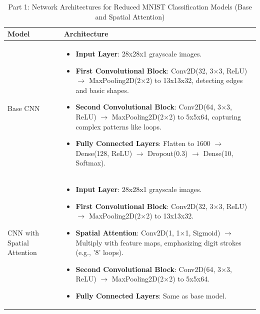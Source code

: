 \documentclass[12pt]{article}
\begin{document}
\begin{table}[H]
    \centering
    \caption{Part 1: Network Architectures for Reduced MNIST Classification Models (Base and Spatial Attention)}
    \label{tab:architectures_part1}
    \begin{tabularx}{\textwidth}{l X}
        \toprule
        \textbf{Model} & \textbf{Architecture} \\
        \midrule
        Base CNN & 
        \begin{itemize}
            \item \textbf{Input Layer}: 28x28x1 grayscale images.
            \item \textbf{First Convolutional Block}: Conv2D(32, 3$\times$3, ReLU) $\rightarrow$ MaxPooling2D(2$\times$2) to 13x13x32, detecting edges and basic shapes.
            \item \textbf{Second Convolutional Block}: Conv2D(64, 3$\times$3, ReLU) $\rightarrow$ MaxPooling2D(2$\times$2) to 5x5x64, capturing complex patterns like loops.
            \item \textbf{Fully Connected Layers}: Flatten to 1600 $\rightarrow$ Dense(128, ReLU) $\rightarrow$ Dropout(0.3) $\rightarrow$ Dense(10, Softmax).
        \end{itemize} \\
        \midrule
        CNN with Spatial Attention & 
        \begin{itemize}
            \item \textbf{Input Layer}: 28x28x1 grayscale images.
            \item \textbf{First Convolutional Block}: Conv2D(32, 3$\times$3, ReLU) $\rightarrow$ MaxPooling2D(2$\times$2) to 13x13x32.
            \item \textbf{Spatial Attention}: Conv2D(1, 1$\times$1, Sigmoid) $\rightarrow$ Multiply with feature maps, emphasizing digit strokes (e.g., '8' loops).
            \item \textbf{Second Convolutional Block}: Conv2D(64, 3$\times$3, ReLU) $\rightarrow$ MaxPooling2D(2$\times$2) to 5x5x64.
            \item \textbf{Fully Connected Layers}: Same as base model.
        \end{itemize} \\
        \bottomrule
    \end{tabularx}
\end{table}
\end{document}

